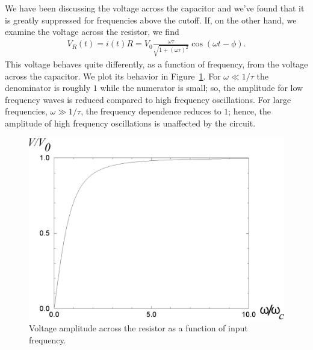 We have been discussing the voltage across the capacitor and we've found that
it is greatly suppressed for frequencies above the cutoff. If, on the other 
hand, we examine the voltage across the resistor, we find
\begin{eqnarray*}
V_R(t) = i(t)R = V_0 \frac{\omega \tau}{\sqrt{1+(\omega \tau)^2}}
         \cos(\omega t - \phi ).
\end{eqnarray*}
This voltage behaves quite differently, as a function of frequency, from the 
voltage across the capacitor. We plot its behavior in 
Figure~\ref{fig:RC:amplitude2}. For $\omega \ll 1/\tau$ the denominator is 
roughly $1$ while the numerator is small; so, the amplitude for low frequency 
waves is reduced compared to high frequency oscillations. For large 
frequencies, $\omega \gg 1/\tau$, the frequency dependence reduces to $
1$; hence, the amplitude of high frequency oscillations is unaffected by the 
circuit.
\begin{figure}[htb]
\centering 
\epsfxsize=10cm \includegraphics[scale=0.5]{5_rccircuits/rampout.eps}
\caption{Voltage amplitude across the resistor as a function of input 
frequency.}
\label{fig:RC:amplitude2}
\end{figure}  

